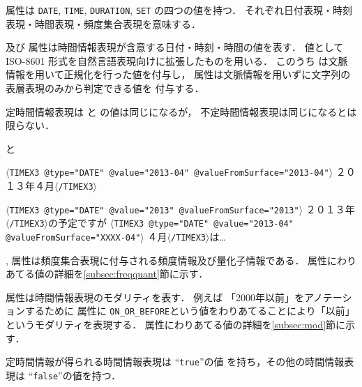 \documentclass[japanese]{jnlp_1.4}
\newcommand{\modified}[1]{}
\def\timexiii{}
\def\type{}
\def\value{}
\def\valuefromsurface{}
\def\temporalfunction{}
\def\definite{}
\def\freq{}
\def\quant{}
\def\mod{}
\begin{document}
\type 属性は {\tt DATE}, {\tt TIME}, {\tt DURATION}, {\tt SET} の四つの値を持つ．
それぞれ日付表現・時刻表現・時間表現・頻度集合表現を意味する．

\value 及び \valuefromsurface 属性は時間情報表現が含意する日付・時刻・時間の値を表す．
値として ISO-8601 形式を自然言語表現向けに拡張したものを用いる．
このうち \value は文脈情報を用いて正規化を行った値を付与し，
\valuefromsurface 属性は文脈情報を用いずに文字列の表層表現のみから判定できる値を
付与する．

\modified{ここで \value と\valuefromsurface 属性の違いについて例を用いて説明する．
「２０１３年４月」という表現は，文脈を用いなくても表層の文字列から時間軸上に一意
に曖昧性解消ができる．
「４月」という表現に対して，文脈情報からそれが2013年の「４月」であるとわか
る場合には以下のように記述する（ここで属性にわりあてる値の詳細については \ref{subsec:value}節に示す）．}
定時間情報表現は \value と \valuefromsurface の値は同じになるが，
不定時間情報表現は同じになるとは限らない．


{\addtolength{\linewidth}{-6zw}\setlength{\leftskip}{3zw}
\begin{itembox}[l]{\value と \valuefromsurface}
{\small 
{\tt $\langle$TIMEX3 @type="DATE" @value="2013-04" @valueFromSurface="2013-04"$\rangle$}
２０１３年４月{\tt $\langle$/TIMEX3$\rangle$}

{\tt $\langle$TIMEX3 @type="DATE" @value="2013" @valueFromSurface="2013"$\rangle$}
２０１３年{\tt $\langle$/TIMEX3$\rangle$}の予定ですが
{\tt $\langle$TIMEX3 @type="DATE" @value="2013-04" @valueFromSurface="XXXX-04"$\rangle$}
４月{\tt $\langle$/TIMEX3$\rangle$}は…}
\end{itembox}
\par}


\freq, \quant 属性は頻度集合表現に付与される頻度情報及び量化子情報である．
属性にわりあてる値の詳細を\ref{subsec:freqquant}節に示す．

\mod 属性は時間情報表現のモダリティを表す．
例えば 「2000年以前」をアノテーションするために
\mod 属性に {\tt ON\_OR\_BEFORE}という値をわりあてることにより「以前」というモダリティを表現する．
属性にわりあてる値の詳細を\ref{subsec:mod}節に示す．

\modified{\definite 属性は ``{\tt true}'', ``{\tt false}'' のいずれかの値を持ち，
\value 属性が，文脈情報により}定時間情報が得られる時間情報表現は ``{\tt true}''の値
を持ち，その他の時間情報表現は ``{\tt false}''の値を持つ．
\modified{言い換えると，日付・時刻表現が時間軸上の特定時区間に写像できる場合と
時間・頻度集合表現の時間幅が特定できる場合に ``{\tt true}''の値を持ち，そうでない場合
に ``{\tt false}''の値を持つ．}
\modified{例えば，以下の例はともに \temporalfunction が ``{\tt false}'' の例である．
「１０日」という表現は，文脈から「４月」ということがわかるが，何年かまではわから
ないために定時間情報が得られない．なお，\definite 属性は作業・分析の便宜上導入したもので，元の ISO-TimeML の \timexiii には規定されていない．}
\end{document}
